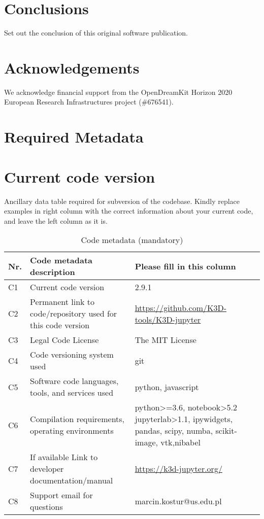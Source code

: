 \documentclass[preprint,12pt, a4paper]{elsarticle}
\begin{document}
\section{Conclusions}
\label{}

Set out the conclusion of this original software publication.

\section*{Acknowledgements}
\label{}
We acknowledge financial support from the OpenDreamKit Horizon 2020 European Research Infrastructures project (\#676541).


 


\section*{Required Metadata}
\label{}

\section*{Current code version}
\label{}

Ancillary data table required for subversion of the codebase. Kindly replace examples in right column with the correct information about your current code, and leave the left column as it is.

\begin{table}[!h]
\begin{tabular}{|l|p{6.5cm}|p{6.5cm}|}
\hline
\textbf{Nr.} & \textbf{Code metadata description} & \textbf{Please fill in this column} \\
\hline
C1 & Current code version & 2.9.1 \\
\hline
C2 & Permanent link to code/repository used for this code version & \url{https://github.com/K3D-tools/K3D-jupyter} \\
\hline
C3 & Legal Code License   &The MIT License  \\
\hline
C4 & Code versioning system used & git \\
\hline
C5 & Software code languages, tools, and services used &  python, javascript \\
\hline
C6 & Compilation requirements, operating environments &  python>=3.6, notebook>5.2
   jupyterlab>1.1,
   ipywidgets,
   pandas,
   scipy,
   numba,
   scikit-image,
   vtk,nibabel \\
\hline
C7 & If available Link to developer documentation/manual & \url{https://k3d-jupyter.org/} \\
\hline
C8 & Support email for questions & marcin.kostur@us.edu.pl  \\
\hline
\end{tabular}
\caption{Code metadata (mandatory)}
\label{} 
\end{table}
\end{document}
